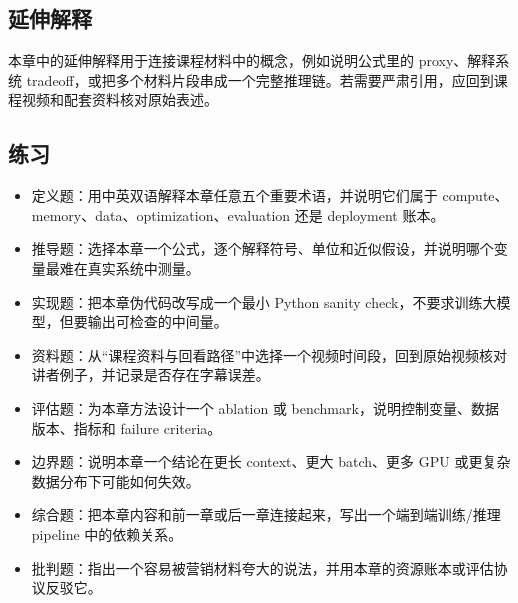 \documentclass[a4paper]{article}
\begin{document}
\subsection{延伸解释}
本章中的延伸解释用于连接课程材料中的概念，例如说明公式里的 proxy、解释系统 tradeoff，或把多个材料片段串成一个完整推理链。若需要严肃引用，应回到课程视频和配套资料核对原始表述。
\subsection{练习}
\begin{itemize}
\item 定义题：用中英双语解释本章任意五个重要术语，并说明它们属于 compute、memory、data、optimization、evaluation 还是 deployment 账本。
\item 推导题：选择本章一个公式，逐个解释符号、单位和近似假设，并说明哪个变量最难在真实系统中测量。
\item 实现题：把本章伪代码改写成一个最小 Python sanity check，不要求训练大模型，但要输出可检查的中间量。
\item 资料题：从“课程资料与回看路径”中选择一个视频时间段，回到原始视频核对讲者例子，并记录是否存在字幕误差。
\item 评估题：为本章方法设计一个 ablation 或 benchmark，说明控制变量、数据版本、指标和 failure criteria。
\item 边界题：说明本章一个结论在更长 context、更大 batch、更多 GPU 或更复杂数据分布下可能如何失效。
\item 综合题：把本章内容和前一章或后一章连接起来，写出一个端到端训练/推理 pipeline 中的依赖关系。
\item 批判题：指出一个容易被营销材料夸大的说法，并用本章的资源账本或评估协议反驳它。
\end{itemize}
\end{document}
